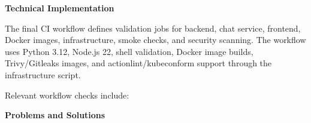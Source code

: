 \vspace{0.5em}\noindent\textbf{Technical Implementation}\par

The final CI workflow defines validation jobs for backend, chat service,
frontend, Docker images, infrastructure, smoke checks, and security
scanning. The workflow uses Python 3.12, Node.js 22, shell validation,
Docker image builds, Trivy/Gitleaks images, and actionlint/kubeconform
support through the infrastructure script.

Relevant workflow checks include:

\begin{Shaded}
\begin{Highlighting}[]
 
 
 
  
\end{Highlighting}
\end{Shaded}

\vspace{0.5em}\noindent\textbf{Problems and Solutions}\par

